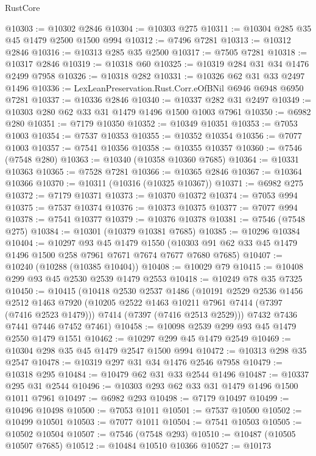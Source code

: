 \begin{lexlean}{RustCore}
\begin{coremodule}
@10303 := @10302 @2846
@10304 := @10303 @275
@10311 := @10304 @285 @35 @45 @1479 @2500 @1500 @994
@10312 := @7496 @7281
@10313 := @10312 @2846
@10316 := @10313 @285 @35 @2500
@10317 := @7505 @7281
@10318 := @10317 @2846
@10319 := @10318 @60
@10325 := @10319 @284 @31 @34 @1476 @2499 @7958
@10326 := @10318 @282
@10331 := @10326 @62 @31 @33 @2497 @1496
@10336 := LexLeanPreservation.Rust.Corr.eOfBNil @6946 @6948 @6950 @7281
@10337 := @10336 @2846
@10340 := @10337 @282 @31 @2497
@10349 := @10303 @280 @62 @33 @31 @1479 @1496 @1500 @1003 @7961
@10350 := @6982 @280
@10351 := @7179 @10350
@10352 := @10349 @10351
@10353 := @7053 @1003
@10354 := @7537 @10353
@10355 := @10352 @10354
@10356 := @7077 @1003
@10357 := @7541 @10356
@10358 := @10355 @10357
@10360 := @7546 (@7548 @280)
@10363 := @10340 (@10358 @10360 @7685)
@10364 := @10331 @10363
@10365 := @7528 @7281
@10366 := @10365 @2846
@10367 := @10364 @10366
@10370 := @10311 (@10316 (@10325 @10367))
@10371 := @6982 @275
@10372 := @7179 @10371
@10373 := @10370 @10372
@10374 := @7053 @994
@10375 := @7537 @10374
@10376 := @10373 @10375
@10377 := @7077 @994
@10378 := @7541 @10377
@10379 := @10376 @10378
@10381 := @7546 (@7548 @275)
@10384 := @10301 (@10379 @10381 @7685)
@10385 := @10296 @10384
@10404 := @10297
    @93
    @45
    @1479
    @1550
    (@10303 @91 @62 @33 @45 @1479 @1496 @1500 @258 @7961 @7671 @7674 @7677 @7680 @7685)
@10407 := @10240 (@10288 (@10385 @10404))
@10408 := @10029 @79
@10415 := @10408 @299 @93 @45 @2530 @2539 @1479 @2553
@10418 := @10249 @78 @35 @7325
@10450 := @10415
    (@10418
      @2530
      @2537
      @1486
      (@10191
        @2529
        @2536
        @1456
        @2512
        @1463
        @7920
        (@10205 @2522 @1463 @10211 @7961 @7414 (@7397 (@7416 @2523 @1479)))
        @7414
        (@7397 (@7416 @2513 @2529)))
      @7432
      @7436
      @7441
      @7446
      @7452
      @7461)
@10458 := @10098 @2539 @299 @93 @45 @1479 @2550 @1479 @1551
@10462 := @10297 @299 @45 @1479 @2549
@10469 := @10304 @298 @35 @45 @1479 @2547 @1500 @994
@10472 := @10313 @298 @35 @2547
@10478 := @10319 @297 @31 @34 @1476 @2546 @7958
@10479 := @10318 @295
@10484 := @10479 @62 @31 @33 @2544 @1496
@10487 := @10337 @295 @31 @2544
@10496 := @10303 @293 @62 @33 @31 @1479 @1496 @1500 @1011 @7961
@10497 := @6982 @293
@10498 := @7179 @10497
@10499 := @10496 @10498
@10500 := @7053 @1011
@10501 := @7537 @10500
@10502 := @10499 @10501
@10503 := @7077 @1011
@10504 := @7541 @10503
@10505 := @10502 @10504
@10507 := @7546 (@7548 @293)
@10510 := @10487 (@10505 @10507 @7685)
@10512 := @10484 @10510 @10366
@10527 := @10173

\end{coremodule}
\end{lexlean}
